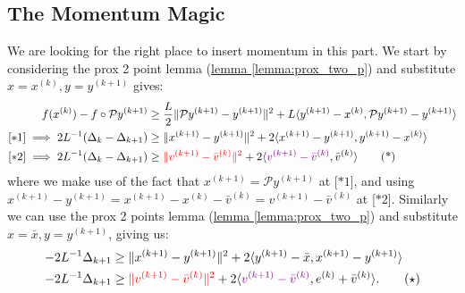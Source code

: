 \documentclass[]{article}
\theoremstyle{definition}
\begin{document}
    \subsection{The Momentum Magic}
        We are looking for the right place to insert momentum in this part. We start by considering the prox 2 point lemma (\hyperref[lemma:prox_two_p]{lemma \ref*{lemma:prox_two_p}}) and substitute $x = x^{(k)}, y = y^{(k + 1)}$ gives: 
        \begin{align*}
            f(x^{(k)}) - f\circ \mathcal Py^{(k + 1)}
            &\ge 
            \frac{L}{2}\Vert \mathcal Py^{(k + 1)} - y^{(k + 1)}\Vert^2 + 
            L \langle y^{(k + 1)} - x^{(k)}, \mathcal P y^{(k + 1)} - y^{(k + 1)}\rangle 
            \\
            [*1]\implies
            2L^{-1} (\Delta_k - \Delta_{k + 1}) 
            &\ge 
            \Vert x^{(k + 1)} - y^{(k + 1)}\Vert^2 + 
            2 \langle x^{(k + 1)} - y^{(k + 1)}, y^{(k + 1)} - x^{(k)}\rangle
            \\
            [*2]\implies
            2L^{-1} (\Delta_k - \Delta_{k + 1})  
            & \ge 
            \textcolor{red}
            {
                \Vert 
                    v^{(k + 1)} - \bar v^{(k)}
                \Vert^2
            }
             + 
            2\langle \textcolor{violet}{v^{(k + 1)} - \bar v^{(k)}}, \bar v^{(k)}\rangle
            \tag{*}
        \end{align*}
        where we make use of the fact that $x^{(k + 1)} = \mathcal P y^{(k + 1)}$ at [$*1$], and using $x^{(k + 1)} - y^{(k + 1)} = x^{(k + 1)} - x^{(k)} - \bar v^{(k)} = v^{(k + 1)} - \bar v^{(k)}$ at [$*2$]. Similarly we can use the prox 2 points lemma (\hyperref[lemma:prox_two_p]{lemma \ref*{lemma:prox_two_p}}) and substitute $x = \bar x, y = y^{(k + 1)}$, giving us: 
        \begin{align*}
            -2L^{-1}\Delta_{k + 1} 
            &\ge 
            \Vert x^{(k + 1)} - y^{(k + 1)}\Vert^2 + 2
            \langle y^{(k + 1)} - \bar x, x^{(k + 1)} - y^{(k + 1)}\rangle
            \\
            -2L^{-1}\Delta_{k + 1} 
            & \ge 
            \textcolor{red}
            {
                \Vert 
                    v^{(k + 1)} - \bar v^{(k)}
                \Vert^2
            } + 
            2\langle  
                \textcolor{violet}{v^{(k + 1)} - \bar v^{(k)}},
                e^{(k)} + \bar v^{(k)}
            \rangle.
            \tag{$\star$}
        \end{align*}
\end{document}
